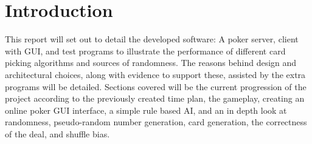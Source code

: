 \section{Introduction}
This report will set out to detail the developed software: A poker server,
client with GUI, and test programs to illustrate the performance of different
card picking algorithms and sources of randomness. The reasons behind design
and architectural choices, along with evidence to support these, assisted by
the extra programs will be detailed. Sections covered will be the current
progression of the project according to the previously created time plan, the
gameplay, creating an online poker GUI interface, a simple rule based AI,
and an in depth look at randomness, pseudo-random number generation,
card generation, the correctness of the deal, and shuffle bias.
